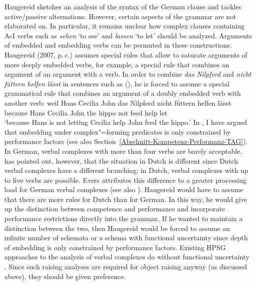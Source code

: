 \begin{exe}
\begin{xlist}[iv.]
\begin{exe}
\begin{xlist}[iv.]
Haugereid sketches an analysis of the syntax of the German clause and tackles active/passive alternations.
However, certain aspects of the grammar are not elaborated on. In particular, it remains unclear how complex clauses containing AcI verbs such as
\emph{sehen} `to see' and \emph{lassen} `to let' should be analyzed. Arguments of embedded and embedding verbs can be permuted in
these constructions. Haugereid (2007, p.\,c.) assumes special rules that allow to saturate arguments of more deeply embedded verbs, for example,
a special rule that combines an  argument of an argument with a verb. In order to combine \emph{das Nilpferd} and \emph{nicht füttern helfen
  lässt} in sentences such as (), he is forced to assume a special grammatical rule that combines an argument of a doubly embedded verb with another verb:
\ea
\label{ex-nilpferd-fuettern-helfen-laesst}
\gll weil    Hans Cecilia John das Nilpferd nicht füttern helfen lässt\\
     because Hans Cecilia John the hippo not feed help let\\
\glt `because Hans is not letting Cecilia help John feed the hippo.'
\z
\largerpage[2]
In \citet[]{Mueller2004b}, I have argued that embedding under complex"=forming predicates is only constrained by performance factors
(see also Section~\ref{Abschnitt-Kompetenz-Performanz-TAG}). In German, verbal complexes with more than four verbs are barely acceptable.
\citet[--59]{Evers75a} has pointed out, however, that the situation in Dutch is different since Dutch verbal complexes have a different branching:
in Dutch, verbal complexes with up to five verbs are possible. Evers attributes this difference to a greater processing load for German verbal complexes
(see also \citealp[Section~3.7]{Gibson98a}). Haugereid would have to assume that there are more rules
for Dutch than for German. In this way, he would give up the distinction between competence and
performance and incorporate performance restrictions directly into the grammar. If he wanted to maintain a distinction between the two, then Haugereid would
be forced to assume an infinite number of schemata or a schema with functional uncertainty since depth of embedding is only
constrained by performance factors. Existing HPSG approaches to the analysis of verbal complexes do
without functional uncertainty \citep{HN94a}.
Since such raising analyses are required for object raising anyway (as discussed above), they should be given preference.


\end{xlist}
\end{exe}
\end{xlist}
\end{exe}
